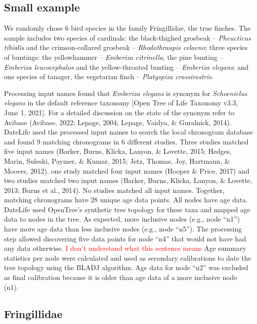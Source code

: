 \documentclass[
  english,
  man]{apa6}
\begin{document}
\hypertarget{small-example}{%
\subsection{Small example}\label{small-example}}

We randomly chose 6 bird species in the family Fringillidae, the true finches. The sample includes
two species of cardinals:
the black-thighed grosbeak -- \emph{Pheucticus tibialis} and
the crimson-collared grosbeak -- \emph{Rhodothraupis celaeno};
three species of buntings:
the yellowhammer -- \emph{Emberiza citrinella},
the pine bunting -- \emph{Emberiza leucocephalos} and
the yellow-throated bunting -- \emph{Emberiza elegans};
and one species of tanager, the vegetarian finch -- \emph{Platyspiza crassirostris}.

Processing input names found that \emph{Emberiza elegans} is synonym for \emph{Schoeniclus elegans} in the default reference taxonomy {[}Open Tree of Life Taxonomy v3.3, June 1, 2021{]}. For a detailed discussion on the state of the synonym refer to Avibase (Avibase, 2022; Lepage, 2004; Lepage, Vaidya, \& Guralnick, 2014).
DateLife used the processed input names to search the local chronogram database and found 9 matching chronograms in 6 different studies. Three studies matched five input names (Barker, Burns, Klicka, Lanyon, \& Lovette, 2015; Hedges, Marin, Suleski, Paymer, \& Kumar, 2015; Jetz, Thomas, Joy, Hartmann, \& Mooers, 2012), one study matched four input names (Hooper \& Price, 2017) and two studies matched two input names (Barker, Burns, Klicka, Lanyon, \& Lovette, 2013; Burns et al., 2014). No studies matched all input names. Together, matching chronograms have 28 unique age data points. All nodes have age data.
DateLife used OpenTree's synthetic tree topology for these taxa and mapped age data to nodes in the tree.
As expected, more inclusive nodes (e.g., node ``n1'') have more age data than less inclusive nodes (e.g., node ``n5'').
The processing step allowed discovering five data points for node ``n4'' that would not have had any data otherwise. \textcolor{red}{I don't understand what this sentence means}
Age summary statistics per node were calculated and used as secondary calibrations to date the tree topology using the BLADJ algorithm.
Age data for node ``n2'' was excluded as final calibration because it is older than age data of a more inclusive node (n1).

\hypertarget{fringillidae}{%
\subsection{Fringillidae}\label{fringillidae}}
\end{document}
